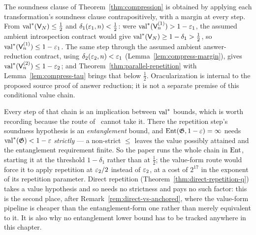 \begin{remark}
\label{rem:compression-chain}
The soundness clause of Theorem~\ref{thm:compression} is obtained by applying each
transformation's soundness clause contrapositively, with a margin at every step. From
$\mathrm{val}^*(\mathsf{V}_N) \leq \frac12$ and $\delta_1(\varepsilon_1, n) < \frac12$: were
$\mathrm{val}^*(\mathsf{V}^{(1)}_n) > 1 - \varepsilon_1$, the assumed ambient introspection contract would give
$\mathrm{val}^*(\mathsf{V}_N) \geq 1 - \delta_1 > \frac12$, so
$\mathrm{val}^*(\mathsf{V}^{(1)}_n) \leq 1 - \varepsilon_1$. The same step through
the assumed ambient answer-reduction contract, using $\delta_2(\varepsilon_2, n) < \varepsilon_1$
(Lemma~\ref{lem:compress-margin}), gives
$\mathrm{val}^*(\mathsf{V}^{(2)}_n) \leq 1 - \varepsilon_2$; and
Theorem~\ref{thm:parallel-repetition} with Lemma~\ref{lem:compress-tau} brings that below
$\frac12$. Oracularization is internal to the proposed source proof of answer
reduction; it is not a separate premise of this conditional value chain.

Every step of that chain is an implication between $\mathrm{val}^*$ bounds, which is worth
recording because the route of~\cite{JNVWY20} cannot take it. There the repetition step's
soundness hypothesis is an \emph{entanglement} bound, and $\mathrm{Ent}(\mathfrak{G}, 1 - \varepsilon) = \infty$
needs $\mathrm{val}^*(\mathfrak{G}) < 1 - \varepsilon$ \emph{strictly} --- a non-strict $\leq$ leaves the value
possibly attained and the entanglement requirement finite. So the paper runs the whole
chain in $\mathrm{Ent}$, starting it at the threshold $1 - \delta_1$ rather than at $\frac12$; the
value-form route would force it to apply repetition at $\varepsilon_2/2$ instead of $\varepsilon_2$, at a
cost of $2^{17}$ in the exponent of its repetition parameter. Direct repetition
(Theorem~\ref{thm:direct-repetition-q}) takes a value hypothesis and so needs no
strictness and pays no such factor: this is the second place, after
Remark~\ref{rem:direct-vs-anchored}, where the value-form pipeline is cheaper than the
entanglement-form one rather than merely equivalent to it. It is also why no entanglement
lower bound has to be tracked anywhere in this chapter.
\end{remark}

